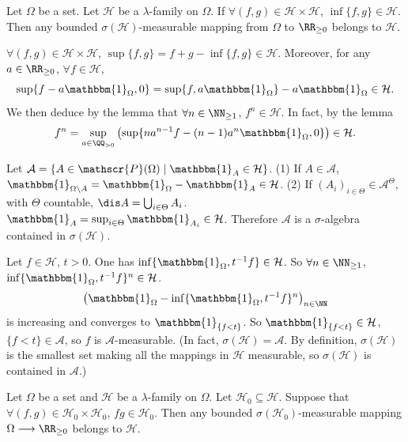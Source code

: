 \begin{theoremenv}
    Let $\Omega$ be a set. Let $\mathcal{H}$ be a $\lambda$-family on $\Omega$. If $\forall (f,g)\in \mathcal{H}\times \mathcal{H}$, $\inf\{f,g\}\in \mathcal{H}$. Then any bounded $\sigma(\mathcal{H})$-measurable mapping from $\Omega$ to $\RR_{\ge 0}$ belongs to $\mathcal{H}$.
\end{theoremenv}
\begin{proofenv}
    $\forall (f,g)\in \mathcal{H}\times \mathcal{H}$, $\sup\{f,g\}=f+g-\inf\{f,g\}\in \mathcal{H}$.
    Moreover, for any $a\in \RR_{\ge 0}$, $\forall f\in \mathcal{H}$,
    $$ \sup\{ f-a\mathbbm{1}_{\Omega},0\}=\sup\{f,a\mathbbm{1}_\Omega\}-a\mathbbm{1}_{\Omega}\in \mathcal{H}.$$
    We then deduce by the lemma that $\forall n\in\NN_{\ge 1}$, $f^n\in \mathcal{H}$.
    In fact, by the lemma
    $$f^n=\sup_{a\in \QQ_{>0}}\left(\sup\{na^{n-1}f-(n-1)a^n\mathbbm{1}_\Omega,0\}\right)\in \mathcal{H}.$$

    Let $\mathcal{A}=\{A\in\mathscr{P}(\Omega)\mid \mathbbm{1}_{A}\in \mathcal{H}\}$.
    \newline
    (1) If $A\in \mathcal{A}$, $\mathbbm{1}_{\Omega\setminus A}=\mathbbm{1}_{\Omega}-\mathbbm{1}_{A}\in \mathcal{H}$.
    \newline
    (2) If $(A_i)_{i\in \Theta}\in \mathcal{A}^\Theta$, with $\Theta$ countable, $\dis A=\bigcup_{i\in \Theta}A_i$. $\mathbbm{1}_{A}=\sup_{i\in \Theta}\mathbbm{1}_{A_i}\in\mathcal{H}$.
    Therefore $\mathcal{A}$ is a $\sigma$-algebra contained in $\sigma(\mathcal{H})$.

    \quad Let $f\in \mathcal{H}$, $t>0$. One has $\inf\{\mathbbm{1}_{\Omega}, t^{-1}f\}\in \mathcal{H}$.
    So $\forall n\in \NN_{\ge 1}$, $\inf\{\mathbbm{1}_{\Omega}, t^{-1}f\}^n\in \mathcal{H}$.
    $$ \left(\mathbbm{1}_{\Omega}-\inf\{\mathbbm{1}_{\Omega},t^{-1} f\}^n\right)_{n\in \NN} $$
    is increasing and converges to $\mathbbm{1}_{\{f<t\}}$. 
    So $\mathbbm{1}_{\{f<t\}}\in \mathcal{H}$, $\{f<t\}\in \mathcal{A}$, so $f$ is $\mathcal{A}$-measurable.
    (In fact, $\sigma(\mathcal{H})=\mathcal{A}$. By definition, $\sigma(\mathcal{H})$ is the smallest set making all the mappings in $\mathcal{H}$ measurable, so $\sigma(\mathcal{H})$ is contained in $\mathcal{A}$.)
\end{proofenv}
\begin{theoremenv}
    Let $\Omega$ be a set and $\mathcal{H}$ be a $\lambda$-family on $\Omega$. Let $\mathcal{H}_0\subseteq \mathcal{H}$. Suppose that $\forall(f,g)\in \mathcal{H}_0\times \mathcal{H}_0$, $fg\in \mathcal{H}_0$. Then any bounded $\sigma(\mathcal{H}_0)$-measurable mapping $\Omega\longrightarrow \RR_{\ge 0}$ belongs to $\mathcal{H}$.
\end{theoremenv}
